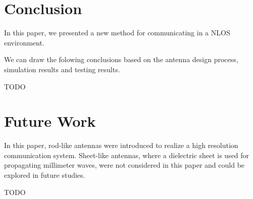 \documentclass[a4paper,12pt]{report}
\begin{document}
\chapter{Conclusion}

In this paper,
we presented a new method for communicating in a NLOS environment.

We can draw the folowing conclusions based on the
antenna design process, simulation results and testing results.

TODO

\chapter{Future Work}

In this paper,
rod-like antennas were introduced to realize a
high resolution communication system.
Sheet-like antennas,
where a dielectric sheet is used for propagating millimeter waves,
were not considered in this paper
and could be explored in future studies.

TODO

\newpage
{}

\end{document}
